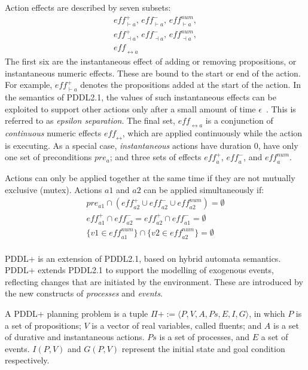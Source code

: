 Action effects are described by seven subsets:
$$
\begin{array}{l}
\mathit{eff}^{+}_{\vdash a},\,\mathit{eff}^{-}_{\vdash a},\,\mathit{eff}^{num}_{\vdash a}, \\
\mathit{eff}^{+}_{\dashv a},\,\mathit{eff}^{-}_{\dashv a},\,\mathit{eff}^{num}_{\dashv a}, \\
\mathit{eff}_{\leftrightarrow a}
\end{array}
$$
The first six are the instantaneous effect of adding or removing propositions, or instantaneous numeric effects. These are bound to the start or end of the action. For example, $\mathit{eff}^{+}_{\vdash a}$ denotes the propositions added at the start of the action. In the semantics of PDDL2.1, the values of such instantaneous effects can be exploited to support other actions only after a small amount of time $\epsilon$~\cite{fox03}. This is referred to as \textit{epsilon separation}. The final set, $\mathit{eff}_{\leftrightarrow a}$ is a conjunction of \textit{continuous} numeric effects $\mathit{eff}_{\leftrightarrow}$, which are applied continuously while the action is executing. As a special case, \textit{instantaneous} actions have duration $0$, have only one set of preconditions $pre_a$; and three sets of effects $\mathit{eff}^{+}_a$, $\mathit{eff}^{-}_a$, and $\mathit{eff}^{num}_a$.

Actions can only be applied together at the same time if they are not mutually exclusive (mutex). Actions $a1$ and $a2$ can be applied simultaneously if:
$$
\begin{array}{c}
pre_{a1} \cap (\mathit{eff}^{+}_{a2} \cup \mathit{eff}^{-}_{a2} \cup \mathit{eff}^{num}_{a2}) = \emptyset \\
\mathit{eff}^{+}_{a1} \cap \mathit{eff}^{-}_{a2} = \mathit{eff}^{+}_{a2} \cap \mathit{eff}^{-}_{a1} = \emptyset \\
\{v1 \in \mathit{eff}^{num}_{a1}\} \cap \{v2 \in \mathit{eff}^{num}_{a2}\} = \emptyset \\
\end{array}
$$

PDDL+ is an extension of PDDL2.1, based on hybrid automata semantics. PDDL+ extends PDDL2.1 to support the modelling of exogenous events, reflecting changes that are initiated by the environment. These are introduced by the new constructs of \textit{processes} and \textit{events}.

\begin{definition}\label{def:pddl+}
A PDDL+ planning problem is a tuple $\Pi+:=\big \langle P,V,A,Ps,E,I,G\big \rangle $, in which $P$ is a set of propositions; $V$ is a vector of real variables, called fluents; and $A$ is a set of durative and instantaneous actions. $Ps$ is a set of processes, and $E$ a set of events. $I(P,V)$ and $G(P,V)$ represent the initial state and goal condition respectively.
\end{definition}

